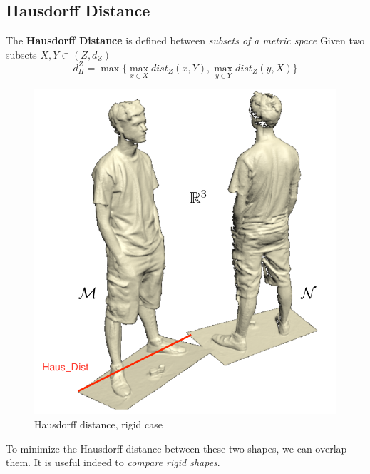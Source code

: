 \documentclass[11pt]{article}
\begin{document}
\subsection{Hausdorff Distance}
The \textbf{Hausdorff Distance} is defined between \textit{subsets of a metric space}
Given two subsets $X,Y \subset (Z,d_Z)$
\begin{equation}
	d_{H}^{Z} = \max \{\max_{x \in X} dist_Z(x,Y), \max_{y \in Y} dist_Z(y,X)\}
\end{equation}

\begin{figure}[H]
\includegraphics[scale=0.3]{res/images/haus_dist.png}
\centering
\caption{Hausdorff distance, rigid case}
\label{}
\end{figure}	
To minimize the Hausdorff distance between these two shapes, we can overlap them.
It is useful indeed to \textit{compare rigid shapes}.
\end{document}
